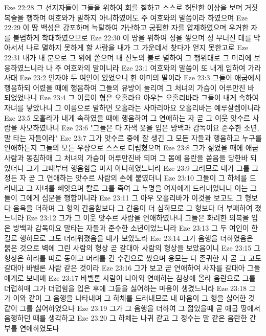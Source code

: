 Eze 22:28  그 선지자들이 그들을 위하여 회를 칠하고 스스로 허탄한 이상을 보며 거짓 복술을 행하며 여호와가 말하지 아니하였어도 주 여호와의 말씀이라 하였으며
Eze 22:29  이 땅 백성은 강포하며 늑탈하여 가난하고 궁핍한 자를 압제하였으며 우거한 자를 불법하게 학대하였으므로
Eze 22:30  이 땅을 위하여 성을 쌓으며 성 무너진 데를 막아서서 나로 멸하지 못하게 할 사람을 내가 그 가운데서 찾다가 얻지 못한고로
Eze 22:31  내가 내 분으로 그 위에 쏟으며 내 진노의 불로 멸하여 그 행위대로 그 머리에 보응하였느니라 나 주 여호와의 말이니라
Eze 23:1  여호와의 말씀이 또 내게 임하여 가라사대
Eze 23:2  인자야 두 여인이 있었으니 한 어미의 딸이라
Eze 23:3  그들이 애굽에서 행음하되 어렸을 때에 행음하여 그들의 유방이 눌리며 그 처녀의 가슴이 어루만진 바 되었었나니
Eze 23:4  그 이름이 형은 오홀라요 아우는 오홀리바라 그들이 내게 속하여 자녀를 낳았나니 그 이름으로 말하면 오홀라는 사마리아요 오홀리바는 예루살렘이니라
Eze 23:5  오홀라가 내게 속하였을 때에 행음하여 그 연애하는 자 곧 그 이웃 앗수르 사람을 사모하였나니
Eze 23:6  "그들은 다 자색 옷을 입은 방백과 감독이요 준수한 소년, 말 타는 자들이라"
Eze 23:7  그가 앗수르 중에 잘 생긴 그 모든 자들과 행음하고 누구를 연애하든지 그들의 모든 우상으로 스스로 더럽혔으며
Eze 23:8  그가 젊었을 때에 애굽 사람과 동침하매 그 처녀의 가슴이 어루만진바 되며 그 몸에 음란을 쏟음을 당한바 되었더니 그가 그때부터 행음함을 마지 아니하였느니라
Eze 23:9  그러므로 내가 그를 그 정든 자 곧 그 연애하는 앗수르 사람의 손에 붙였더니
Eze 23:10  그들이 그 하체를 드러내고 그 자녀를 빼앗으며 칼로 그를 죽여 그 누명을 여자에게 드러내었나니 이는 그들이 그에게 심문을 행함이니라
Eze 23:11  그 아우 오홀리바가 이것을 보고도 그 형보다 음욕을 더하며 그 형의 간음함보다 그 간음이 더 심하므로 그 형보다 더 부패하여 졌느니라
Eze 23:12  그가 그 이웃 앗수르 사람을 연애하였나니 그들은 화려한 의복을 입은 방백과 감독이요 말타는 자들과 준수한 소년이었느니라
Eze 23:13  그 두 여인이 한 길로 행하므로 그도 더러워졌음을 내가 보았노라
Eze 23:14  그가 음행을 더하였음은 붉은 것으로 벽에 그린 사람의 형상 곧 갈대아 사람의 형상을 보았음이니
Eze 23:15  그 형상은 허리를 띠로 동이고 머리를 긴 수건으로 쌌으며 용모는 다 존귀한 자 곧 그 고토 갈대아 바벨론 사람 같은 것이라
Eze 23:16  그가 보고 곧 연애하여 사자를 갈대아 그들에게로 보내매
Eze 23:17  바벨론 사람이 나아와 연애하는 침상에 올라 음란으로 그를 더럽히매 그가 더럽힘을 입은 후에 그들을 싫어하는 마음이 생겼느니라
Eze 23:18  그가 이와 같이 그 음행을 나타내며 그 하체를 드러내므로 내 마음이 그 형을 싫어한 것 같이 그를 싫어하였으나
Eze 23:19  그가 그 음행을 더하여 그 젊었을때 곧 애굽 땅에서 음행하던 때를 생각하고
Eze 23:20  그 하체는 나귀 같고 그 정수는 말 같은 음란한 간부를 연애하였도다
